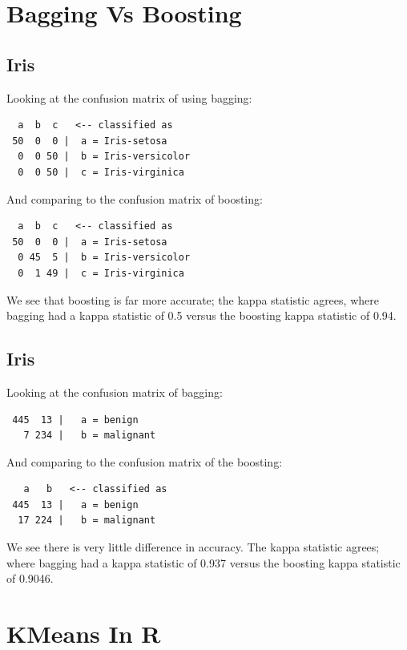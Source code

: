 \documentclass[12pt]{scrartcl}
\begin{document}
\section{Bagging Vs Boosting}
\subsection{Iris}
Looking at the confusion matrix of using bagging:

\begin{verbatim}
  a  b  c   <-- classified as
 50  0  0 |  a = Iris-setosa
  0  0 50 |  b = Iris-versicolor
  0  0 50 |  c = Iris-virginica
\end{verbatim}

And comparing to the confusion matrix of boosting:

\begin{verbatim}
  a  b  c   <-- classified as
 50  0  0 |  a = Iris-setosa
  0 45  5 |  b = Iris-versicolor
  0  1 49 |  c = Iris-virginica
\end{verbatim}

We see that boosting is far more accurate; the kappa statistic agrees, where bagging had a kappa statistic of 0.5 versus the boosting kappa statistic of 0.94.

\subsection{Iris}
Looking at the confusion matrix of bagging:

\begin{verbatim}
 445  13 |   a = benign
   7 234 |   b = malignant
\end{verbatim}

And comparing to the confusion matrix of the boosting:

\begin{verbatim}
   a   b   <-- classified as
 445  13 |   a = benign
  17 224 |   b = malignant
\end{verbatim}

We see there is very little difference in accuracy. The kappa statistic agrees; where bagging had a kappa statistic of 0.937 versus the boosting kappa statistic of 0.9046.

\section{KMeans In R}

\end{document}
